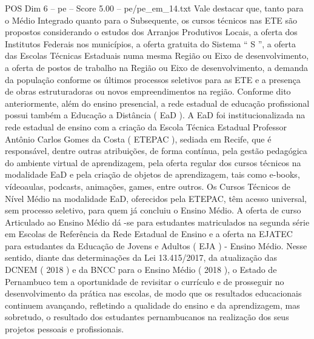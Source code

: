 \begin{textsample}{POS Dim 6 – pe – Score 5.00 – pe/pe\_em\_14.txt}
Vale destacar que, tanto para o Médio Integrado quanto para o Subsequente, os cursos técnicos nas ETE são propostos considerando o estudos dos Arranjos Produtivos Locais, a oferta dos Institutos Federais nos municípios, a oferta gratuita do Sistema “ S ”, a oferta das Escolas Técnicas Estaduais numa mesma Região ou Eixo de desenvolvimento, a oferta de postos de trabalho na Região ou Eixo de desenvolvimento, a demanda da população conforme os últimos processos seletivos para as ETE e a presença de obras estruturadoras ou novos empreendimentos na região.
Conforme dito anteriormente, além do ensino presencial, a rede estadual de educação profissional possui também a Educação a Distância ( EaD ).
A EaD foi institucionalizada na rede estadual de ensino com a criação da Escola Técnica Estadual Professor Antônio Carlos Gomes da Costa ( ETEPAC ), sediada em Recife, que é responsável, dentre outras atribuições, de forma contínua, pela gestão pedagógica do ambiente virtual de aprendizagem, pela oferta regular dos cursos técnicos na modalidade EaD e pela criação de objetos de aprendizagem, tais como e-books, vídeoaulas, podcasts, animações, games, entre outros.
Os Cursos Técnicos de Nível Médio na modalidade EaD, oferecidos pela ETEPAC, têm acesso universal, sem processo seletivo, para quem já concluiu o Ensino Médio.
A oferta de curso Articulado ao Ensino Médio dá -se para estudantes matriculados na segunda série em Escolas de Referência da Rede Estadual de Ensino e a oferta na EJATEC para estudantes da Educação de Jovens e Adultos ( EJA ) - Ensino Médio.
Nesse sentido, diante das determinações da Lei 13.415/2017, da atualização das DCNEM ( 2018 ) e da BNCC para o Ensino Médio ( 2018 ), o Estado de Pernambuco tem a oportunidade de revisitar o currículo e de prosseguir no desenvolvimento da prática nas escolas, de modo que os resultados educacionais continuem avançando, refletindo a qualidade do ensino e da aprendizagem, mas sobretudo, o resultado dos estudantes pernambucanos na realização dos seus projetos pessoais e profissionais.

\end{textsample}
